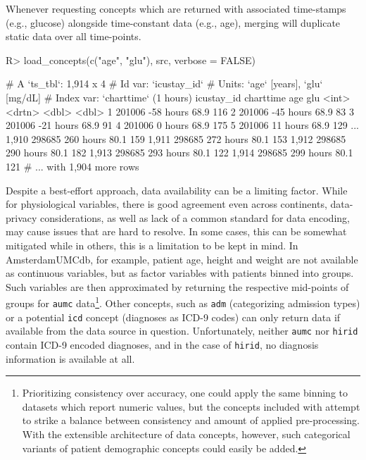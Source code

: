 \documentclass[
  notitle]{jss}
\begin{document}
Whenever requesting concepts which are returned with associated
time-stamps (e.g., glucose) alongside time-constant data (e.g., age),
merging will duplicate static data over all time-points.

\begin{CodeChunk}
\begin{CodeInput}
R> load_concepts(c("age", "glu"), src, verbose = FALSE)
\end{CodeInput}
\begin{CodeOutput}
# A `ts_tbl`: 1,914 x 4
# Id var:     `icustay_id`
# Units:      `age` [years], `glu` [mg/dL]
# Index var:  `charttime` (1 hours)
      icustay_id charttime   age   glu
           <int> <drtn>    <dbl> <dbl>
    1     201006 -58 hours  68.9   116
    2     201006 -45 hours  68.9    83
    3     201006 -21 hours  68.9    91
    4     201006   0 hours  68.9   175
    5     201006  11 hours  68.9   129
  ...
1,910     298685 260 hours  80.1   159
1,911     298685 272 hours  80.1   153
1,912     298685 290 hours  80.1   182
1,913     298685 293 hours  80.1   122
1,914     298685 299 hours  80.1   121
# ... with 1,904 more rows
\end{CodeOutput}
\end{CodeChunk}

Despite a best-effort approach, data availability can be a limiting
factor. While for physiological variables, there is good agreement even
across continents, data-privacy considerations, as well as lack of a
common standard for data encoding, may cause issues that are hard to
resolve. In some cases, this can be somewhat mitigated while in others,
this is a limitation to be kept in mind. In AmsterdamUMCdb, for example,
patient age, height and weight are not available as continuous
variables, but as factor variables with patients binned into groups.
Such variables are then approximated by returning the respective
mid-points of groups for \texttt{aumc} data\footnote{Prioritizing
  consistency over accuracy, one could apply the same binning to
  datasets which report numeric values, but the concepts included with
   attempt to strike a balance between consistency and amount
  of applied pre-processing. With the extensible architecture of data
  concepts, however, such categorical variants of patient demographic
  concepts could easily be added.}. Other concepts, such as \texttt{adm}
(categorizing admission types) or a potential \texttt{icd} concept
(diagnoses as ICD-9 codes) can only return data if available from the
data source in question. Unfortunately, neither \texttt{aumc} nor
\texttt{hirid} contain ICD-9 encoded diagnoses, and in the case of
\texttt{hirid}, no diagnosis information is available at all.
\end{document}
